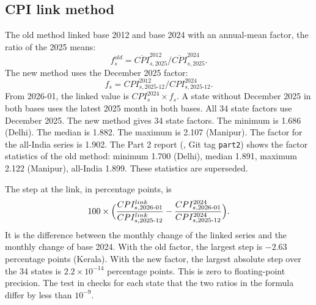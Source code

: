 \documentclass[11pt,a4paper]{article}
\begin{document}
\subsection{CPI link method}
The old method linked base 2012 and base 2024 with an annual-mean factor, the ratio of the 2025 means:
\[ f_s^{old} = \overline{CPI}^{2012}_{s,2025} \big/ \overline{CPI}^{2024}_{s,2025}. \]
The new method uses the December 2025 factor:
\[ f_s = CPI^{2012}_{s,\text{2025-12}} \big/ CPI^{2024}_{s,\text{2025-12}}. \]
From 2026-01, the linked value is $CPI^{2024}_{s} \times f_s$. A state without December 2025 in both bases uses the latest 2025 month in both bases. All 34 state factors use December 2025.
The new method gives 34 state factors. The minimum is 1.686 (Delhi). The median is 1.882. The maximum is 2.107 (Manipur). The factor for the all-India series is 1.902.
The Part 2 report (, Git tag \texttt{part2}) shows the factor statistics of the old method: minimum 1.700 (Delhi), median 1.891, maximum 2.122 (Manipur), all-India 1.899. These statistics are superseded.

The step at the link, in percentage points, is
\[ 100 \times \Bigl( \frac{CPI^{link}_{s,\text{2026-01}}}{CPI^{link}_{s,\text{2025-12}}} - \frac{CPI^{2024}_{s,\text{2026-01}}}{CPI^{2024}_{s,\text{2025-12}}} \Bigr). \] It is the difference between the monthly change of the linked series and the monthly change of base 2024.
With the old factor, the largest step is $-2.63$ percentage points (Kerala). With the new factor, the largest absolute step over the 34 states is $2.2\times10^{-14}$ percentage points. This is zero to floating-point precision. The test  in  checks for each state that the two ratios in the formula differ by less than $10^{-9}$.
\end{document}
